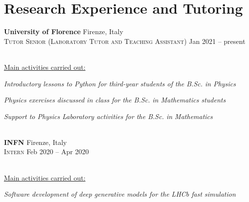\newcommand{\institution}[2]
  {\large \textbf{\color{hlcolor-0} #1} \hfill {\color{hlcolor-2} #2}}

\newcommand{\role}[2]
  {\small \color{hlcolor-1} 
  {\color{iconcolor} \faBriefcase}
  \textsc{#1} \hfill 
  {\color{iconcolor} \faClock}
  {#2}}


\section*{Research Experience and Tutoring}
\begin{cvcontent}
  \institution{University of Florence}{Firenze, Italy}\\ [0.5mm]
  \role{Tutor Senior (Laboratory Tutor and Teaching Assistant)}{Jan 2021 -- present}\\ [1.5mm]
  \\ [1.5mm]
  {\normalsize \color{maincolor} \ul{Main activities carried out:}\\ [1.5mm]
  \begin{itemize*}[label=\textcolor{iconcolor}{\textbullet}]
    \item \emph{Introductory lessons to Python for third-year 
      students of the B.Sc. in Physics}\\ [0.5mm]
    \item \emph{Physics exercises discussed in class for the 
      B.Sc. in Mathematics students}\\ [0.5mm]
    \item \emph{Support to Physics Laboratory activities for 
      the B.Sc. in Mathematics}
  \end{itemize*}}
  \\ [4mm]
  \institution{INFN}{Firenze, Italy}\\ [0.5mm]
  \role{Intern}{Feb 2020 -- Apr 2020}\\ [1.5mm]
  \\ [1.5mm]
  {\normalsize \color{maincolor} \ul{Main activities carried out:}\\ [1.5mm]
  \begin{itemize*}[label=\textcolor{iconcolor}{\textbullet}]
    \item \emph{Software development of deep generative models 
      for the LHCb fast simulation}\\ [0.5mm]

\end{itemize*}}
\end{cvcontent}
